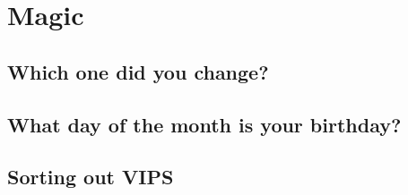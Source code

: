 \chapter{Magic}
\section{Which one did you change?}
\section{What day of the month is your birthday?}
\section{Sorting out VIPS}